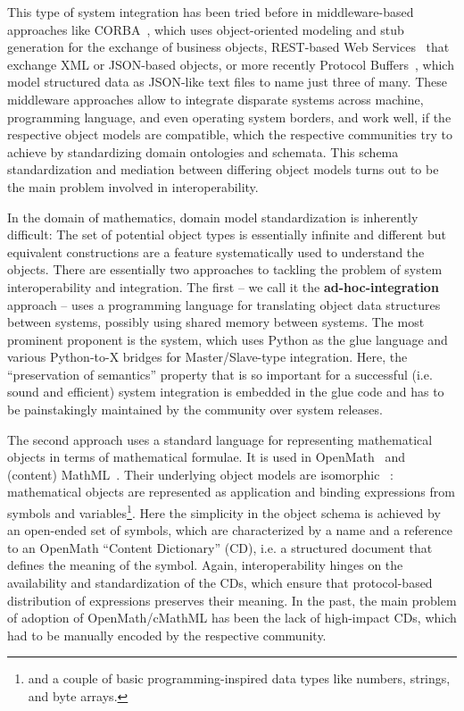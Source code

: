 This type of system integration has been tried before in middleware-based approaches like CORBA~\cite{Omg:Corba:Web}, which uses object-oriented modeling and stub generation for the exchange of business objects, REST-based Web Services~\cite{WSDL:on,Mitra:soapPrimer03} that exchange XML or JSON-based objects, or more recently Protocol Buffers~\cite{protobuffers:on}, which model structured data as JSON-like text files to name just three of many.
These middleware approaches allow to integrate disparate systems across machine, programming language, and even operating system borders, and work well, if the respective object models are compatible, which the respective communities try to achieve by standardizing domain ontologies and schemata. This schema standardization and mediation between differing object models turns out to be the main problem involved in interoperability.

In the domain of mathematics, domain model standardization is inherently difficult: The set of potential object types is essentially infinite and different but equivalent constructions are a feature systematically used to understand the objects.
There are essentially two approaches to tackling the problem of system interoperability and integration.
The first -- we call it the \textbf{ad-hoc-integration} approach -- uses a programming language for translating object data structures between systems, possibly using shared memory between systems. The most prominent proponent is the \Sage system, which uses Python as the glue language and various Python-to-X bridges for Master/Slave-type integration.
Here, the ``preservation of semantics'' property that is so important for a successful (i.e. sound and efficient) system integration is embedded in the glue code and has to be painstakingly maintained by the community over system releases. 

The second approach uses a standard language for representing mathematical objects in terms of mathematical formulae. It is used in OpenMath~\cite{BusCapCar:2oms04} and  (content) MathML~\cite{CarlisleEd:MathML3:base}.
Their underlying object models are isomorphic ~\cite{KohRab:som12}: mathematical objects are represented as application and binding expressions from symbols and variables\footnote{and a couple of basic programming-inspired data types like numbers, strings, and byte arrays.}.
Here the simplicity in the object schema is achieved by an open-ended set of symbols, which are characterized by a name and a reference to an OpenMath ``Content Dictionary'' (CD), i.e. a structured document that defines the meaning of the symbol.
Again, interoperability hinges on the availability and standardization of the CDs, which ensure that protocol-based distribution of expressions preserves their meaning.
In the past, the main problem of adoption of OpenMath/cMathML has been the lack of high-impact CDs, which had to be manually encoded by the respective community.



